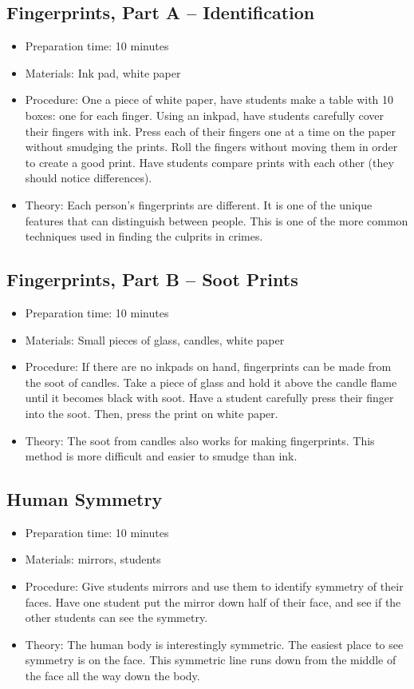 \subsection{Fingerprints, Part A – Identification}
\begin{itemize}
\item{Preparation time: 10 minutes}
\item{Materials: Ink pad, white paper }
\item{Procedure: One a piece of white paper, have students make a table with 10 boxes: one for each finger. Using an inkpad, have students carefully cover their fingers with ink. Press each of their fingers one at a time on the paper without smudging the prints. Roll the fingers without moving them in order to create a good print. Have students compare prints with each other (they should notice differences).}
\item{Theory: Each person’s fingerprints are different. It is one of the unique features that can distinguish between people. This is one of the more common techniques used in finding the culprits in crimes.}
\end{itemize}

\subsection{Fingerprints, Part B – Soot Prints}
\begin{itemize}
\item{Preparation time: 10 minutes}
\item{Materials: Small pieces of glass, candles, white paper}
\item{Procedure: If there are no inkpads on hand, fingerprints can be made from the soot of candles. Take a piece of glass and hold it above the candle flame until it becomes black with soot. Have a student carefully press their finger into the soot. Then, press the print on white paper.}
\item{Theory: The soot from candles also works for making fingerprints. This method is more difficult and easier to smudge than ink.}
\end{itemize}

\subsection{Human Symmetry}
\begin{itemize}
\item{Preparation time: 10 minutes}
\item{Materials: mirrors, students}
\item{Procedure: Give students mirrors and use them to identify symmetry of their faces. Have one student put the mirror down half of their face, and see if the other students can see the symmetry.}
\item{Theory: The human body is interestingly symmetric. The easiest place to see symmetry is on the face. This symmetric line runs down from the middle of the face all the way down the body.}
\end{itemize}

